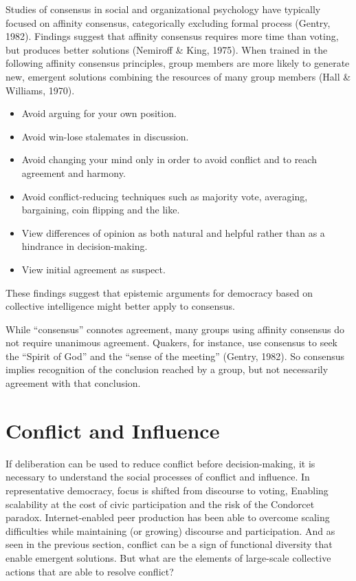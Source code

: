 Studies of consensus in social and organizational psychology have typically focused on affinity consensus, categorically excluding formal process (Gentry, 1982). Findings suggest that affinity consensus requires more time than voting, but produces better solutions (Nemiroff \& King, 1975). When trained in the following affinity consensus principles, group members are more likely to generate new, emergent solutions combining the resources of many group members (Hall \& Williams, 1970). 
\begin{itemize}
\item{Avoid arguing for your own position.}
\item{Avoid win-lose stalemates in discussion.}
\item{Avoid changing your mind only in order to avoid conflict and to reach agreement and harmony.}
\item{Avoid conflict-reducing techniques such as majority vote, averaging, bargaining, coin flipping and the like.}
\item{View differences of opinion as both natural and helpful rather than as a hindrance in decision-making.}
\item{View initial agreement as suspect.}
\end{itemize}
These findings suggest that epistemic arguments for democracy based on collective intelligence might better apply to consensus.

While ``consensus'' connotes agreement, many groups using affinity consensus do not require unanimous agreement. Quakers, for instance, use consensus to seek the ``Spirit of God'' and the ``sense of the meeting'' (Gentry, 1982). So consensus implies recognition of the conclusion reached by a group, but not necessarily agreement with that conclusion.

\section{Conflict and Influence}
If deliberation can be used to reduce conflict before decision-making,
it is necessary to understand the social processes of conflict and influence.
In representative democracy, focus is shifted from discourse to voting, 
Enabling scalability at the cost of civic participation and the risk of the Condorcet paradox. Internet-enabled peer production has been able to overcome scaling difficulties while maintaining (or growing) discourse and participation. And as seen in the previous section, conflict can be a sign of functional diversity that enable emergent solutions. But what are the elements of large-scale collective actions that are able to resolve conflict?

